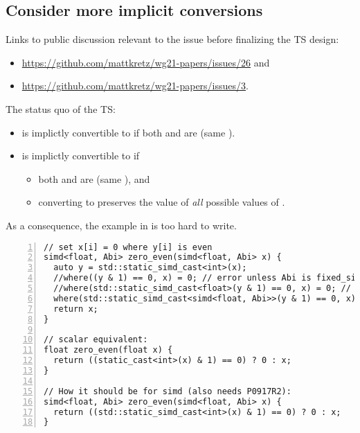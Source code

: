 \subsection{Consider more implicit conversions} \ghfeedback
Links to public discussion relevant to the issue before finalizing the TS design:
\begin{itemize}
  \item \url{https://github.com/mattkretz/wg21-papers/issues/26} and
  \item \url{https://github.com/mattkretz/wg21-papers/issues/3}.
\end{itemize}

The status quo of the TS:
\begin{itemize}
  \item {} is implictly convertible to  if both  and  are  (same ).
  \item {} is implictly convertible to  if
    \begin{itemize}
      \item both  and  are  (same ), and
      \item converting  to  preserves the value of \emph{all} possible values of .
    \end{itemize}
\end{itemize}

As a consequence, the example in  is too hard to write.

\begin{lstlisting}[style=Vc,numbers=left,float,label=lst:missing mask conversion,caption={
  Conversion verbosity
}]
// set x[i] = 0 where y[i] is even
simd<float, Abi> zero_even(simd<float, Abi> x) {
  auto y = std::static_simd_cast<int>(x);
  //where((y & 1) == 0, x) = 0; // error unless Abi is fixed_size
  //where(std::static_simd_cast<float>(y & 1) == 0, x) = 0; // error unless Abi is fixed_size
  where(std::static_simd_cast<simd<float, Abi>>(y & 1) == 0, x) = 0; // works
  return x;
}

// scalar equivalent:
float zero_even(float x) {
  return ((static_cast<int>(x) & 1) == 0) ? 0 : x;
}

// How it should be for simd (also needs P0917R2):
simd<float, Abi> zero_even(simd<float, Abi> x) {
  return ((std::static_simd_cast<int>(x) & 1) == 0) ? 0 : x;
}
\end{lstlisting}

